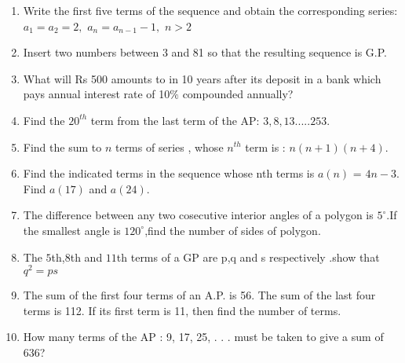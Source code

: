 \begin{enumerate}[label=\thesection.\arabic*,ref=\thesection.\theenumi]
\item Write the first five terms of the sequence and obtain the corresponding series:\\
$a_1=a_2=2,$ $a_n=a_{n-1} -1,$ $n>2$\\
\solution

\pagebreak
\item Insert two numbers between 3 and 81 so that the resulting sequence is G.P.\\

\solution

\pagebreak

\item  What will Rs 500 amounts to in 10 years after its deposit in a bank which pays annual interest rate of 10$\%$ compounded annually?

\solution
    
\pagebreak

\item Find the $20^{th}$ term from the last term of the AP: $3,8,13.....253$.

\solution


\pagebreak
\item Find the sum to $n$ terms of series , whose $n^{th}$ term is : $n(n+1)(n+4)$.

\solution

\pagebreak

\item Find the indicated terms in the sequence whose nth terms is $a(n)$ = $4n-3$. Find $a(17)$ and $a(24)$.
    
\solution 

\pagebreak

\item The difference between any two cosecutive interior angles of a polygon is $5^\circ$.If the smallest angle is $120^\circ$,find the number of sides of polygon. \\
\solution

\pagebreak
\item The $5$th,$8$th and $11$th terms of a GP are p,q and s respectively .show that $q^2=ps$ \\
\solution

\pagebreak
\item The sum of the first four terms of an A.P. is 56. The sum of the last four terms is
 112. If its first term is 11, then find the number of terms.\\
\solution

\item How many terms of the AP : 9, 17, 25, . . . must be taken to give a sum of 636?
\pagebreak
\end{enumerate}
